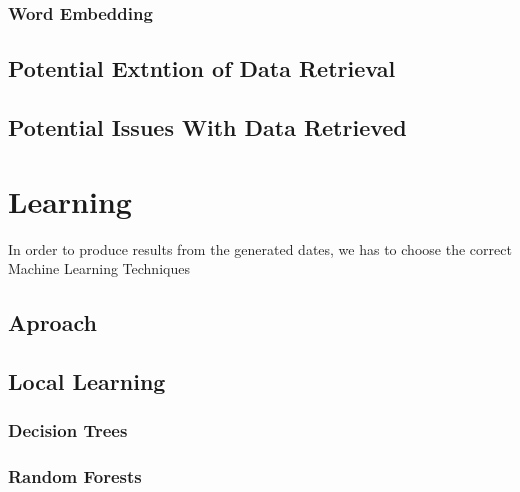 \documentclass[bsc,frontabs,twoside,singlespacing,parskip,deptreport]{infthesis}     %
\begin{document}
\subsection{Word Embedding}
\section{Potential Extntion of Data Retrieval}
\section{Potential Issues With Data Retrieved}



\chapter{Learning}
In order to produce results from the generated dates,
we has to choose the correct Machine Learning Techniques
\section{Aproach}

\section{Local Learning}
\subsection{Decision Trees}
\subsection{Random Forests}
\end{document}

